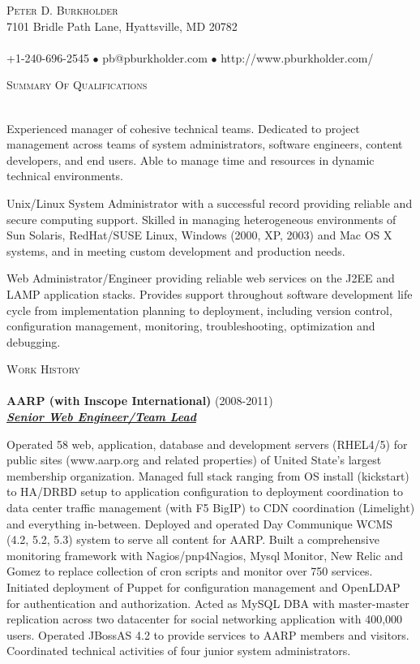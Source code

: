 \documentclass{article}
\newcommand{\lineunder}{\vspace*{-8pt} \\ \hspace*{-18pt} \hrulefill \\}
\newcommand{\header}[1]{{\hspace*{-15pt}\vspace*{6pt} \textsc{#1}} \vspace*{-6pt} \lineunder}
\newcommand{\employer}[3]{{ \textbf{#1} (#2)\\ \underline{\textbf{\emph{#3}}}\\  }}
\newcommand{\contact}[3]{
    \vspace*{-8pt}
    \begin{center}
        {\LARGE \scshape {#1}}\\
        #2 \lineunder 
        #3
    \end{center}
    \vspace*{-8pt}
}
\newenvironment{achievements}{\begin{list}{\topsep 0pt \itemsep -2pt}} {\vspace*{4pt}\end{list}}
\begin{document}
\small
\smallskip
\vspace*{-44pt}

\contact{Peter D. Burkholder}
{7101 Bridle Path Lane, Hyattsville, MD 20782}
{+1-240-696-2545 $\bullet$ pb@pburkholder.com  $\bullet$ http://www.pburkholder.com/}

\header{Summary Of Qualifications}
\begin{achievements}
    \item Experienced manager of cohesive technical teams.  Dedicated to project management across teams of system administrators, software engineers, content developers, and end users.  Able to manage time and resources in dynamic technical environments.
    \item Unix/Linux System Administrator with a successful record providing reliable and secure computing support.  Skilled in managing heterogeneous environments of Sun Solaris, RedHat/SUSE Linux, Windows (2000, XP, 2003) and Mac OS X systems, and in meeting custom development and production needs.
    \item Web Administrator/Engineer providing reliable web services on the J2EE and LAMP application stacks.  Provides support throughout software development life cycle from implementation planning to deployment, including version control, configuration management, monitoring, troubleshooting, optimization and debugging.
\end{achievements}

\header{Work History}
\employer{AARP (with Inscope International)}{2008-2011}{Senior Web Engineer/Team Lead}
\begin{achievements}
  \item Operated 58 web, application, database and development servers (RHEL4/5) for public sites (www.aarp.org and related properties) of United State's largest membership organization.  Managed full stack ranging from OS install (kickstart) to HA/DRBD setup to application configuration to deployment coordination to data center traffic management (with F5 BigIP) to CDN coordination (Limelight) and everything in-between.  Deployed and operated Day Communique WCMS (4.2, 5.2, 5.3) system to serve all content for AARP.  Built a comprehensive monitoring framework with Nagios/pnp4Nagios, Mysql Monitor, New Relic and Gomez to replace collection of cron scripts and monitor over 750 services.  Initiated deployment of Puppet for configuration management and OpenLDAP for authentication and authorization.  Acted as MySQL DBA with master-master replication across two datacenter for social networking application with 400,000 users.  Operated JBossAS 4.2 to provide services to AARP members and visitors.  Coordinated technical activities of four junior system administrators.
\end{achievements}
\end{document}
